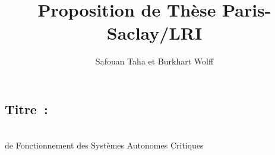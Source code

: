 \documentclass[a4paper,10pt]{article}
\begin{document}
\title{\textbf{Proposition de Thèse Paris-Saclay/LRI}}
\author{Safouan Taha et Burkhart Wolff}
\date{}

\maketitle

\subsection*{Titre~:}
\begin{center}
\large  \\
  de Fonctionnement des Systèmes Autonomes Critiques
\end{center}


\end{document}
